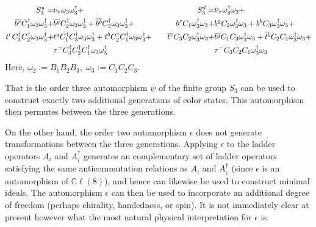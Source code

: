 \documentclass{article}
\newcommand{\bb}[1]{\mathbb{#1}}
\begin{document}
\begin{equation} \notag
 \begin{split}
     S_3^u=&{\nu_{\tau}}\omega_3\omega_3^\dagger + \\  \overline{b^r}{C_1^\dagger}\omega_3\omega_3^\dagger + &\overline{b^g}{C_2^\dagger}\omega_3\omega_3^\dagger + \overline{b^b}{C_3^\dagger}\omega_3\omega_3^\dagger + \\ t^r{C_3^\dagger}{C_2^\dagger}\omega_3\omega_3^\dagger + &t^g{C_1^\dagger}{C_3^\dagger}\omega_3\omega_3^\dagger + t^b{C_2^\dagger}{C_1^\dagger}\omega_3\omega_3^\dagger + \\ &\tau^+{C_3^\dagger}{C_2^\dagger}{C_1^\dagger}\omega_3\omega_3^\dagger
\end{split}
\qquad 
\begin{split}
     S_3^d=&{\overline{\nu}_{\tau}}\omega_3^\dagger\omega_3 + \\ {b}^r{C_1}\omega_3^\dagger\omega_3 + &{b}^g{C_2}\omega_3^\dagger\omega_3 +  {b}^b{C_3}\omega_3^\dagger\omega_3 + \\ \overline{t^r}{C_3}{C_2}\omega_3^\dagger\omega_3 + &\overline{t^g}{C_1}{C_3}\omega_3^\dagger\omega_3 + \overline{t^b}{C_2}{C_1}\omega_3^\dagger\omega_3 + \\ &\tau^-{C_3}{C_2}{C_1}\omega_3^\dagger\omega_3
\end{split}
\end{equation}
Here, $\omega_2:=B_1B_2B_3,\;\omega_3:=C_1C_2C_3$.

That is the order three automorphism $\psi$ of the finite group $S_3$ can be used to construct exactly two additional generations of color states. This automorphism then permutes between the three generations. 

On the other hand, the order two automorphism $\epsilon$ does not generate transformations between the three generations. Applying $\epsilon$ to the ladder operators $A_i$ and $A_i^{\dagger}$ generates an complementary set of ladder operators satisfying the same anticommutation relations as $A_i$ and $A_i^{\dagger}$ (since $\epsilon$ is an automorphism of $\bb{C}\ell(8)$), and hence can likewise be used to construct minimal ideals. The automorphism $\epsilon$ can then be used to incorporate an additional degree of freedom (perhaps chirality, handedness, or spin). It is not immediately clear at present however what the most natural physical interpretation for $\epsilon$ is. 


\end{document}
